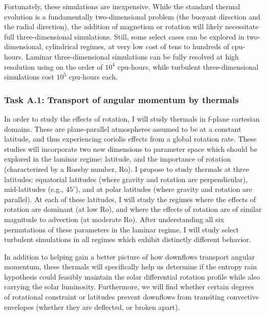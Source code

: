 \documentclass[aasms,12pt]{article}
\begin{document}
Fortunately, these simulations are inexpensive.
While the standard thermal evolution is a fundamentally two-dimensional problem (the buoyant direction and the radial direction), the addition of magnetism or rotation will likely necessitate full three-dimensional simulations.
Still, some select cases can be explored in two-dimensional, cylindrical regimes, at very low cost of tens to hundreds of cpu-hours.
Laminar three-dimensional simulations can be fully resolved at high resolution using on the order of $10^4$ cpu-hours, while turbulent three-dimensional simulations cost $10^5$ cpu-hours each.

\subsubsection{Task A.1: Transport of angular momentum by thermals}
In order to study the effects of rotation, I will study thermals in f-plane cartesian domains.
These are plane-parallel atmospheres assumed to be at a constant latitude, and thus experiencing coriolis effects from a global rotation rate.
These studies will incorporate two new dimensions to parameter space which should be explored in the laminar regime: latitude, and the importance of rotation (characterized by a Rossby number, Ro).
I propose to study thermals at three latitudes: equatorial latitudes (where gravity and rotation are perpendicular), mid-latitudes (e.g., $45^\circ$), and at polar latitudes (where gravity and rotation are parallel).
At each of these latitudes, I will study the regimes where the effects of rotation are dominant (at low Ro), and where the effects of rotation are of similar magnitude to advection (at moderate Ro).
After understanding all six permutations of these parameters in the laminar regime, I will study select turbulent simulations in all regimes which exhibit distinctly different behavior.

In addition to helping gain a better picture of how downflows transport angular momentum, these thermals will specifically help us determine if the entropy rain hypothesis could feasibly maintain the solar differential rotation profile while also carrying the solar luminosity.
Furthermore, we will find whether certain degrees of rotational constraint or latitudes prevent downflows from transiting convective envelopes (whether they are deflected, or broken apart).
\end{document}
